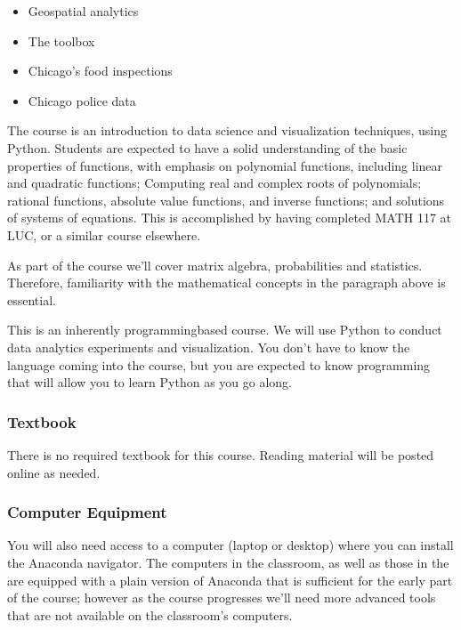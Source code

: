 \documentclass[letterpaper,10pt,english]{sphinxmanual}
\begin{document}
\begin{itemize}
\item {} 
Geospatial analytics

\end{itemize}
\begin{itemize}
\item {} 
The  toolbox

\item {} 
Chicago’s food inspections

\item {} 
Chicago police data

\end{itemize}

The course is an introduction to data science and visualization techniques, using Python. Students are expected to have a solid understanding of the basic properties of functions, with emphasis on polynomial functions, including linear and quadratic functions; Computing real and complex roots of polynomials; rational functions, absolute value functions, and inverse functions; and solutions of systems of equations. This is accomplished by having completed MATH 117 at LUC, or a similar course elsewhere.

As part of the course we’ll cover matrix algebra, probabilities and statistics. Therefore, familiarity with the mathematical concepts in the paragraph above is essential. 

This is an inherently programming\sphinxhyphen{}based course. We will use Python to conduct data analytics experiments and visualization. You don’t have to know the language coming into the course, but you are expected to know  programming that will allow you to learn Python as you go along.


\subsubsection{Textbook}
\label{\detokenize{COMP180/organization:textbook}}
There is no required textbook for this course. Reading material will be posted online as needed.


\subsubsection{Computer Equipment}
\label{\detokenize{COMP180/organization:computer-equipment}}
You will also need access to a computer (laptop or desktop) where you can install the Anaconda navigator. The computers in the classroom, as well as those in the  are equipped with a plain version of Anaconda that is sufficient for the early part of the course; however as the course progresses we’ll need more advanced tools that are not available on the classroom’s computers.
\end{document}
